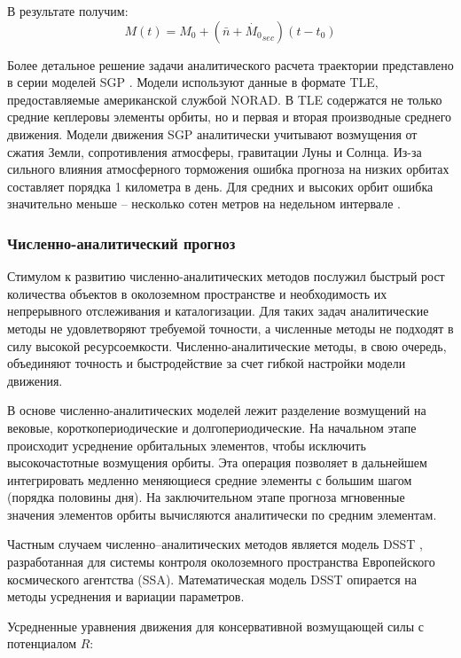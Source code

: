 В результате получим:
\begin{equation*}
    M(t) = M_0 + (\bar{n} + \dot{M_0}_{sec}) (t - t_0)
\end{equation*}

Более детальное решение задачи аналитического расчета траектории представлено в серии моделей SGP \cite{spacetrack80}.
Модели используют данные в формате TLE, предоставляемые американской службой NORAD. 
В TLE содержатся не только средние кеплеровы элементы орбиты, но и первая и вторая производные среднего движения.
Модели движения SGP аналитически учитывают возмущения от сжатия Земли, сопротивления атмосферы, гравитации Луны и Солнца.
Из-за сильного влияния атмосферного торможения ошибка прогноза на низких орбитах составляет порядка 1 километра в день.
Для средних и высоких орбит ошибка значительно меньше -- несколько сотен метров на недельном интервале \cite{vallado2008}. 

\subsubsection{Численно-аналитический прогноз}
Стимулом к развитию численно-аналитических методов послужил быстрый рост количества
объектов в околоземном пространстве и необходимость их непрерывного отслеживания и каталогизации.
Для таких задач аналитические методы не удовлетворяют требуемой точности, а численные методы
не подходят в силу высокой ресурсоемкости. Численно-аналитические методы, в свою очередь,
объединяют точность и быстродействие за счет гибкой настройки модели движения.

В основе численно-аналитических моделей лежит разделение возмущений на вековые, 
короткопериодические и долгопериодические.
На начальном этапе происходит усреднение орбитальных элементов, 
чтобы исключить высокочастотные возмущения орбиты. Эта операция позволяет в дальнейшем
интегрировать медленно меняющиеся средние элементы с большим шагом (порядка половины дня).
На заключительном этапе прогноза мгновенные значения элементов орбиты вычисляются аналитически по средним элементам.

Частным случаем численно--аналитических методов является модель DSST \cite{danielson1995}, разработанная для
системы контроля околоземного пространства Европейского космического агентства (SSA).
Математическая модель DSST опирается на методы усреднения и вариации параметров.

Усредненные уравнения движения для консервативной возмущающей силы с потенциалом $R$:


